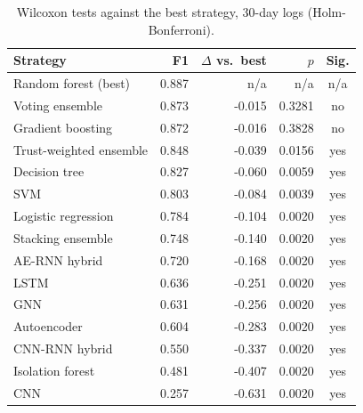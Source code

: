\begin{table}[H]
\centering
\small
\begin{tabular}{lrrrc}
\toprule
Strategy & F1 & $\Delta$ vs.\ best & $p$ & Sig. \\
\midrule
Random forest (best) & 0.887 & n/a & n/a & n/a \\
\midrule
Voting ensemble & 0.873 & -0.015 & 0.3281 & no \\
Gradient boosting & 0.872 & -0.016 & 0.3828 & no \\
Trust-weighted ensemble & 0.848 & -0.039 & 0.0156 & yes \\
Decision tree & 0.827 & -0.060 & 0.0059 & yes \\
SVM & 0.803 & -0.084 & 0.0039 & yes \\
Logistic regression & 0.784 & -0.104 & 0.0020 & yes \\
Stacking ensemble & 0.748 & -0.140 & 0.0020 & yes \\
AE-RNN hybrid & 0.720 & -0.168 & 0.0020 & yes \\
LSTM & 0.636 & -0.251 & 0.0020 & yes \\
GNN & 0.631 & -0.256 & 0.0020 & yes \\
Autoencoder & 0.604 & -0.283 & 0.0020 & yes \\
CNN-RNN hybrid & 0.550 & -0.337 & 0.0020 & yes \\
Isolation forest & 0.481 & -0.407 & 0.0020 & yes \\
CNN & 0.257 & -0.631 & 0.0020 & yes \\
\bottomrule
\end{tabular}
\caption{Wilcoxon tests against the best strategy, 30-day logs (Holm-Bonferroni).}
\label{tab:significance-month}
\end{table}
